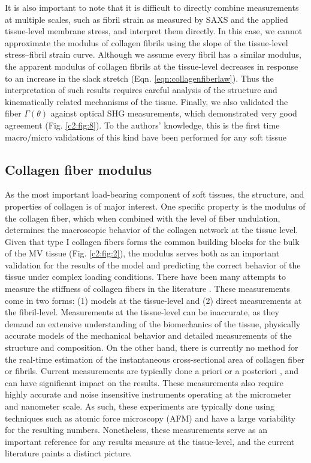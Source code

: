     
    It is also important to note that it is difficult to directly combine measurements at multiple scales, such as fibril strain as measured by SAXS and the applied tissue-level membrane stress, and interpret them directly. In this case, we cannot approximate the modulus of collagen fibrils using the slope of the tissue-level stress–fibril strain curve. Although we assume every fibril has a similar modulus, the apparent modulus of collagen fibrils at the tissue-level decreases in response to an increase in the slack stretch (Eqn. \ref{eqn:collagenfiberlaw}). Thus the interpretation of such results requires careful analysis of the structure and kinematically related mechanisms of the tissue. Finally, we also validated the fiber $\Gamma(\theta)$ against optical SHG measurements, which demonstrated very good agreement (Fig. \ref{c2:fig:8}). To the authors’ knowledge, this is the first time macro/micro validations of this kind have been performed for any soft tissue
    
    


\subsection{Collagen fiber modulus}

    As the most important load-bearing component of soft tissues, the structure, and properties of collagen is of major interest. One specific property is the modulus of the collagen fiber, which when combined with the level of fiber undulation, determines the macroscopic behavior of the collagen network at the tissue level. Given that type I collagen fibers forms the common building blocks for the bulk of the MV tissue (Fig. \ref{c2:fig:2}), the modulus serves both as an important validation for the results of the model and predicting the correct behavior of the tissue under complex loading conditions. There have been many attempts to measure the stiffness of collagen fibers in the literature \cite{shen_stress_2008,gentleman_mechanical_2003,eppell_nano_2006,yang_mechanical_2008,yang_micromechanical_2007,wenger_mechanical_2007}. These measurements come in two forms: (1) models at the tissue-level and (2) direct measurements at the fibril-level. Measurements at the tissue-level can be inaccurate, as they demand an extensive understanding of the biomechanics of the tissue, physically accurate models of the mechanical behavior and detailed measurements of the structure and composition. On the other hand, there is currently no method for the real-time estimation of the instantaneous cross-sectional area of collagen fiber or fibrils. Current measurements are typically done a priori \cite{gentleman_mechanical_2003} or a posteriori \cite{eppell_nano_2006}, and can have significant impact on the results. These measurements also require highly accurate and noise insensitive instruments operating at the micrometer and nanometer scale. As such, these experiments are typically done using techniques such as atomic force microscopy (AFM) and have a large variability for the resulting numbers. Nonetheless, these measurements serve as an important reference for any results measure at the tissue-level, and the current literature paints a distinct picture.


